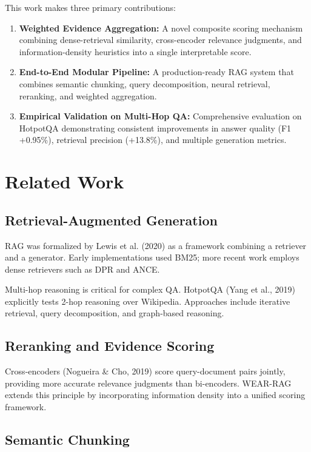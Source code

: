 \documentclass[twocolumn,11pt]{article}
\begin{document}
This work makes three primary contributions:

\begin{enumerate}
\item \textbf{Weighted Evidence Aggregation:} A novel composite scoring mechanism combining dense-retrieval similarity, cross-encoder relevance judgments, and information-density heuristics into a single interpretable score.

\item \textbf{End-to-End Modular Pipeline:} A production-ready RAG system that combines semantic chunking, query decomposition, neural retrieval, reranking, and weighted aggregation.

\item \textbf{Empirical Validation on Multi-Hop QA:} Comprehensive evaluation on HotpotQA demonstrating consistent improvements in answer quality (F1 +0.95\%), retrieval precision (+13.8\%), and multiple generation metrics.
\end{enumerate}

\section{Related Work}

\subsection{Retrieval-Augmented Generation}

RAG was formalized by Lewis et al. (2020) as a framework combining a retriever and a generator. Early implementations used BM25; more recent work employs dense retrievers such as DPR and ANCE.

Multi-hop reasoning is critical for complex QA. HotpotQA (Yang et al., 2019) explicitly tests 2-hop reasoning over Wikipedia. Approaches include iterative retrieval, query decomposition, and graph-based reasoning.

\subsection{Reranking and Evidence Scoring}

Cross-encoders (Nogueira \& Cho, 2019) score query-document pairs jointly, providing more accurate relevance judgments than bi-encoders. WEAR-RAG extends this principle by incorporating information density into a unified scoring framework.

\subsection{Semantic Chunking}
\end{document}
